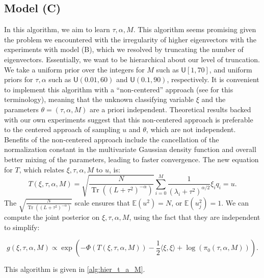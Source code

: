 \documentclass{siamart1116}
\DeclareMathOperator{\Tr}{Tr}
\begin{document}
    \subsection{Model (C)}
        In this algorithm, we aim to learn $\tau, \alpha, M$. This algorithm seems promising given the problem we encountered with the irregularity of higher eigenvectors with the experiments with model (B), which we resolved by truncating the number of eigenvectors. Essentially, we want to be hierarchical about our level of truncation. We take a uniform prior over the integers for $M$ such as $\mathsf{U}[1,70]$, and uniform priors for $\tau, \alpha$ such as $\mathsf{U}(0.01,60)$ and $\mathsf{U}(0.1,90)$, respectively. It is convenient to implement this algorithm with a ``non-centered'' approach (see \cite{Noncentered} for this terminology), meaning that the unknown classifying variable $\xi$ and the parameters $\theta=(\tau,\alpha, M)$ are a priori independent. Theoretical results backed with our own experiments suggest that this non-centered approach is preferable to the centered approach of sampling $u$ and $\theta$, which are not independent. Benefits of the non-centered approach include the cancellation of the normalization constant in the multivariate Gaussian density function and overall better mixing of the parameters, leading to faster convergence. The new equation for $T$, which relates $\xi, \tau, \alpha, M$ to $u$, is:
        \begin{equation}
            \label{eqn:noncentered_T_M}
            T(\xi,\tau,\alpha, M) = \sqrt{\frac{N}{\Tr ((L + \tau^2)^{-\alpha}) }} \sum_{i=0}^M \frac{1}{(\lambda_i+\tau^2)^{\alpha/2}}\xi_iq_i = u.
        \end{equation}
        The $\sqrt{\frac{N}{\Tr ((L + \tau^2)^{-\alpha}) }}$ scale ensures that $\mathbb{E}(u^2) = N$, or $\mathbb{E}(u_j^2) = 1$. We can compute the joint posterior on $\xi, \tau, \alpha, M$, using the fact that they are independent to simplify:

        \begin{equation}
        \label{eqn:noncentered_post_M}
        g(\xi,\tau,\alpha, M) \propto \exp\left( -\Phi(T(\xi,\tau,\alpha,M))-\frac{1}{2}\langle \xi,\xi \rangle + \log(\pi_0(\tau,\alpha,M)) \right).
        \end{equation}

        This algorithm is given in \cref{alg:hier_t_a_M}.
\end{document}
